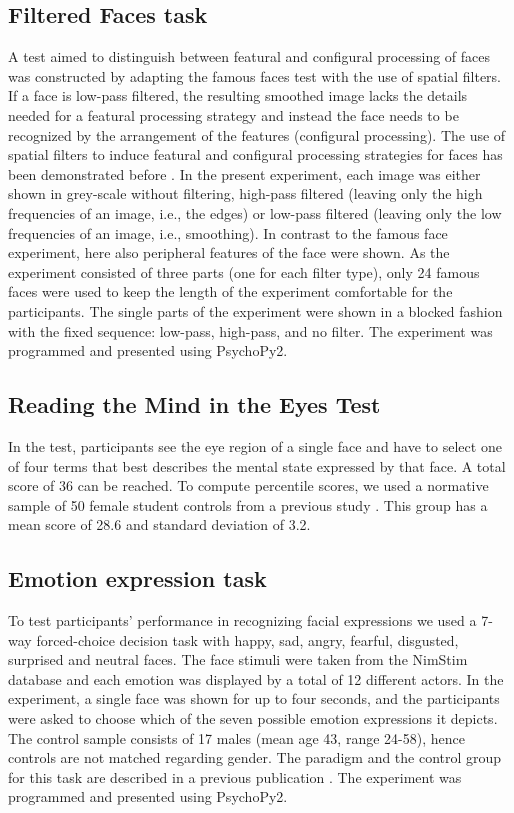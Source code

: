 \documentclass[fleqn,10pt]{SelfArx} %
\begin{document}
\subsection*{Filtered Faces task}
A test aimed to distinguish between featural and configural processing of faces was constructed by adapting the famous faces test with the use of spatial filters. If a face is low-pass filtered, the resulting smoothed image lacks the details needed for a featural processing strategy and instead the face needs to be recognized by the arrangement of the features (configural processing). The use of spatial filters to induce featural and configural processing strategies for faces has been demonstrated before \citep{Goffaux_2005}. In the present experiment, each image was either shown in grey-scale without filtering, high-pass filtered (leaving only the high frequencies of an image, i.e., the edges) or low-pass filtered (leaving only the low frequencies of an image, i.e., smoothing). In contrast to the famous face experiment, here also peripheral features of the face were shown. As the experiment consisted of three parts (one for each filter type), only 24 famous faces were used to keep the length of the experiment comfortable for the participants. The single parts of the experiment were shown in a blocked fashion with the fixed sequence: low-pass, high-pass, and no filter. The experiment was programmed and presented using PsychoPy2.

\subsection*{Reading the Mind in the Eyes Test}
In the test, participants see the eye region of a single face and have to select one of four terms that best describes the mental state expressed by that face. A total score of 36 can be reached. To compute percentile scores, we used a normative sample of 50 female student controls from a previous study \citep{Baron_Cohen_2001}. This group has a mean score of 28.6 and standard deviation of 3.2.

\subsection*{Emotion expression task}
To test participants’ performance in recognizing facial expressions we used a 7-way forced-choice decision task with happy, sad, angry, fearful, disgusted, surprised and neutral faces. The face stimuli were taken from the NimStim database \citep{Tottenham_2009} and each emotion was displayed by a total of 12 different actors. In the experiment, a single face was shown for up to four seconds, and the participants were asked to choose which of the seven possible emotion expressions it depicts. The control sample consists of 17 males (mean age 43, range 24-58), hence controls are not matched regarding gender. The paradigm and the control group for this task are described in a previous publication \citep{Wegrzyn_2017}. The experiment was programmed and presented using PsychoPy2.
\end{document}

